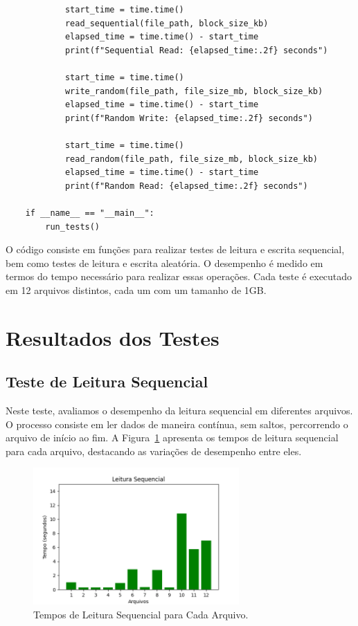\documentclass[
	12pt,				%
	openright,			%
	oneside,			%
	a4paper,			%
	chapter=TITLE,		%
	english,			%
	french,				%
	spanish,			%
	brazil				%
	]{abntex2}
\theoremstyle{definition}
\begin{document}
\begin{lstlisting}
			start_time = time.time()
			read_sequential(file_path, block_size_kb)
			elapsed_time = time.time() - start_time
			print(f"Sequential Read: {elapsed_time:.2f} seconds")
	
			start_time = time.time()
			write_random(file_path, file_size_mb, block_size_kb)
			elapsed_time = time.time() - start_time
			print(f"Random Write: {elapsed_time:.2f} seconds")
	
			start_time = time.time()
			read_random(file_path, file_size_mb, block_size_kb)
			elapsed_time = time.time() - start_time
			print(f"Random Read: {elapsed_time:.2f} seconds")
	
	if __name__ == "__main__":
		run_tests()
\end{lstlisting}


O código consiste em funções para realizar testes de leitura e escrita sequencial, 
bem como testes de leitura e escrita aleatória. O desempenho é medido em termos do 
tempo necessário para realizar essas operações. Cada teste é executado em 12 arquivos 
distintos, cada um com um tamanho de 1GB.

\section{Resultados dos Testes}

\subsection{Teste de Leitura Sequencial}

Neste teste, avaliamos o desempenho da leitura sequencial em diferentes arquivos. 
O processo consiste em ler dados de maneira contínua, sem saltos, percorrendo o 
arquivo de início ao fim. A Figura~\ref{fig:sr} apresenta os tempos de leitura 
sequencial para cada arquivo, destacando as variações de desempenho entre eles.

\begin{figure}[H]
    \centering
    \includegraphics[width=0.7\textwidth]{SeqRead.png}
    \caption{Tempos de Leitura Sequencial para Cada Arquivo.}
    \label{fig:sr}
\end{figure}
\end{document}
